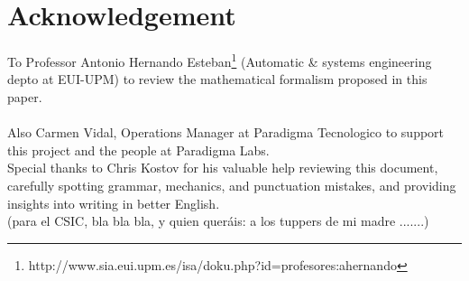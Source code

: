 \newpage

\section{Acknowledgement}

To Professor Antonio Hernando Esteban\footnote{http://www.sia.eui.upm.es/isa/doku.php?id=profesores:ahernando}  (Automatic \& systems engineering depto at EUI-UPM) to review the mathematical formalism proposed in this paper.
\\
\\
Also Carmen Vidal, Operations Manager at Paradigma Tecnologico to support this project and the people at Paradigma Labs.
\\
Special thanks to Chris Kostov for his valuable help reviewing this document, carefully spotting grammar, mechanics, and punctuation mistakes, and providing insights into writing in better English.
\\
(para el CSIC, bla bla bla, y quien queráis: a los tuppers de mi madre .......)
